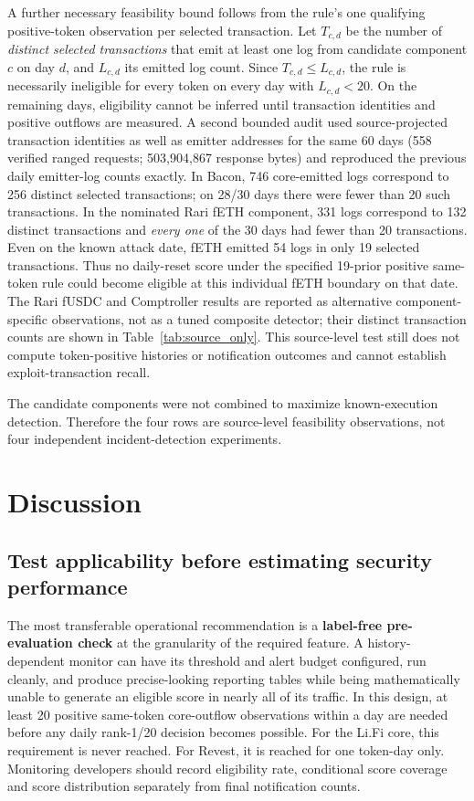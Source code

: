 \documentclass[preprint,12pt,authoryear]{elsarticle}
\begin{document}
A further necessary feasibility bound follows from the rule's one qualifying positive-token observation per selected transaction. Let \(T_{c,d}\) be the number of \emph{distinct selected transactions} that emit at least one log from candidate component \(c\) on day \(d\), and \(L_{c,d}\) its emitted log count. Since \(T_{c,d}\le L_{c,d}\), the rule is necessarily ineligible for every token on every day with \(L_{c,d}<20\). On the remaining days, eligibility cannot be inferred until transaction identities and positive outflows are measured. A second bounded audit used source-projected transaction identities as well as emitter addresses for the same 60 days (558 verified ranged requests; 503,904,867 response bytes) and reproduced the previous daily emitter-log counts exactly. In Bacon, 746 core-emitted logs correspond to 256 distinct selected transactions; on 28/30 days there were fewer than 20 such transactions. In the nominated Rari fETH component, 331 logs correspond to 132 distinct transactions and \emph{every one} of the 30 days had fewer than 20 transactions. Even on the known attack date, fETH emitted 54 logs in only 19 selected transactions. Thus no daily-reset score under the specified 19-prior positive same-token rule could become eligible at this individual fETH boundary on that date. The Rari fUSDC and Comptroller results are reported as alternative component-specific observations, not as a tuned composite detector; their distinct transaction counts are shown in Table~\ref{tab:source_only}. This source-level test still does not compute token-positive histories or notification outcomes and cannot establish exploit-transaction recall.

The candidate components were not combined to maximize known-execution detection. Therefore the four rows are source-level feasibility observations, not four independent incident-detection experiments.

\section{Discussion}\label{discussion}

\subsection{Test applicability before estimating security performance}\label{test-applicability-before-estimating-security-performance}

The most transferable operational recommendation is a \textbf{label-free pre-evaluation check} at the granularity of the required feature. A history-dependent monitor can have its threshold and alert budget configured, run cleanly, and produce precise-looking reporting tables while being mathematically unable to generate an eligible score in nearly all of its traffic. In this design, at least 20 positive same-token core-outflow observations within a day are needed before any daily rank-1/20 decision becomes possible. For the Li.Fi core, this requirement is never reached. For Revest, it is reached for one token-day only. Monitoring developers should record eligibility rate, conditional score coverage and score distribution separately from final notification counts.
\end{document}
